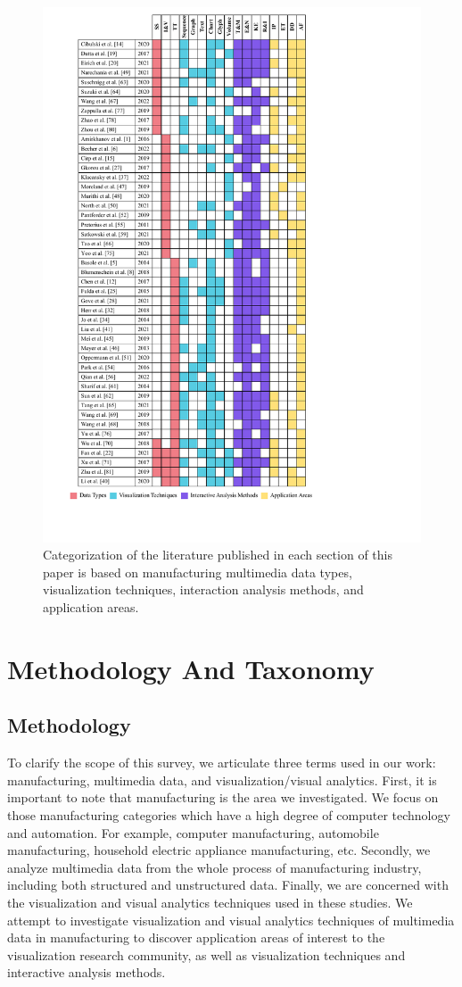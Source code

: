\documentclass[a4paper,fleqn]{cas-dc}
\begin{document}
 
\begin{figure}[pos=t]
	\centering
	\vspace{.5em}
	\includegraphics[width=0.48 \textwidth]{Images/table.pdf}
	\caption{Categorization of the literature published in each section of this paper is based on manufacturing multimedia data types, visualization techniques, interaction analysis methods, and application areas.}
	\vspace{-1em}
	\label{fig:table}
\end{figure}
 
\section{Methodology And Taxonomy}
\subsection{Methodology}
To clarify the scope of this survey, we articulate three terms used in our work: manufacturing, multimedia data, and visualization/visual analytics.
First, it is important to note that manufacturing is the area we investigated.
We focus on those manufacturing categories which have a high degree of computer technology and automation.
For example, computer manufacturing, automobile manufacturing, household electric appliance manufacturing, etc.
Secondly, we analyze multimedia data from the whole process of manufacturing industry, including both structured and unstructured data. 
Finally, we are concerned with the visualization and visual analytics techniques used in these studies.
We attempt to investigate visualization and visual analytics techniques of multimedia data in manufacturing to discover application areas of interest to the visualization research community, as well as visualization techniques and interactive analysis methods.
\end{document}
